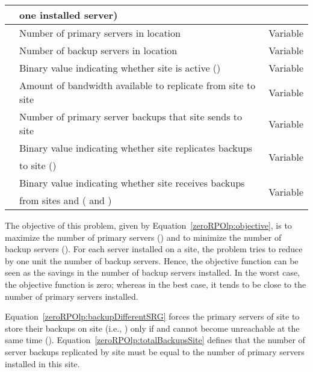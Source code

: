 \documentclass[preprint]{elsarticle}
\begin{document}
\begin{table}
\begin{center}
\begin{tabular}{|c||l||c|}
&one installed server)&\\
\hline  & Number of primary servers in location  &Variable\\
\hline   & Number of backup servers in location  &Variable\\
\hline   &Binary value indicating whether site  is active () &Variable\\
\hline  &Amount of bandwidth available to replicate from site  to site  &Variable\\
\hline  &Number of primary server backups that site  sends to site  &Variable\\
\hline \multirow{2}{*}{} &Binary value indicating whether site  replicates backups &\multirow{2}{*}{Variable}\\
&to site  () &\\
\hline \multirow{2}{*}{} &Binary value indicating whether site  receives backups &\multirow{2}{*}{Variable}\\
&from sites  and  ( and ) &\\
\hline
\end{tabular}
\label{zeroRPOtab:notations}
\end{center}
\end{table}
 




















The objective of this problem, given by Equation~\ref{zeroRPOlp:objective}, is to maximize the number of primary servers () and to minimize the number of backup servers (). For each server installed on a site, the problem tries to reduce by one unit the number of backup servers. Hence, the objective function can be seen as the savings in the number of backup servers installed. In the worst case, the objective function is zero; whereas in the best case, it tends to be close to the number of primary servers installed.

Equation~\ref{zeroRPOlp:backupDifferentSRG} forces the primary servers of site  to store their backups on site  (i.e., ) only if  and  cannot become unreachable at the same time (). 
Equation~\ref{zeroRPOlp:totalBackupsSite} defines that the number of server backups replicated by site  must be equal to the number of primary servers installed in this site.
\end{document}
